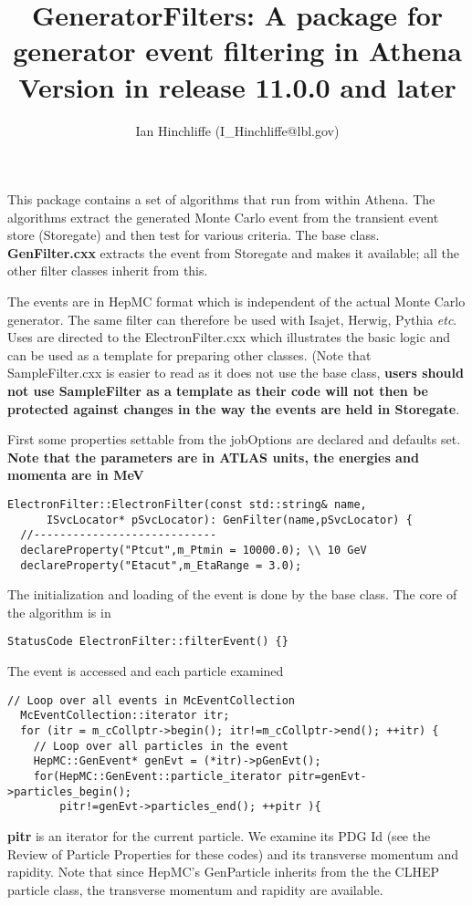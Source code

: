 \documentclass[11pt]{article}
\begin{document}
\title{GeneratorFilters: A package for generator event filtering in  Athena\\
Version in release 11.0.0 and later}
\author{ Ian Hinchliffe (I\_Hinchliffe@lbl.gov)}
\maketitle       
 
This package contains a set of algorithms that run from within Athena.
The algorithms extract the generated Monte Carlo event from the
transient event store (Storegate) and then test for various criteria.
The base class. { \bf GenFilter.cxx} extracts the event from Storegate
and makes it available; all the other filter classes inherit from this.


The events are in HepMC format which is independent of the actual
Monte Carlo generator. The same filter can therefore be used with
Isajet, Herwig, Pythia {\it etc}. Uses are directed to the 
ElectronFilter.cxx which illustrates the basic logic and can be used
as a template for preparing other classes. (Note that SampleFilter.cxx
is easier to read as it does not use the base class, {\bf  users
should not use SampleFilter as a template as their code will not then
be protected against changes in the way the events are held in
Storegate}.

First some properties settable from the jobOptions are declared and
defaults set. {\bf Note that the parameters are in ATLAS units, the
  energies and momenta are in MeV}

\begin{verbatim}
ElectronFilter::ElectronFilter(const std::string& name, 
      ISvcLocator* pSvcLocator): GenFilter(name,pSvcLocator) {
  //----------------------------    
  declareProperty("Ptcut",m_Ptmin = 10000.0); \\ 10 GeV 
  declareProperty("Etacut",m_EtaRange = 3.0); 
\end{verbatim}

The initialization and loading of the event is done by the base
class. The core of the algorithm is in 

\begin{verbatim}
StatusCode ElectronFilter::filterEvent() {}
\end{verbatim}

The event is accessed and each particle examined

\begin{verbatim}
// Loop over all events in McEventCollection
  McEventCollection::iterator itr;
  for (itr = m_cCollptr->begin(); itr!=m_cCollptr->end(); ++itr) {
    // Loop over all particles in the event
    HepMC::GenEvent* genEvt = (*itr)->pGenEvt();
    for(HepMC::GenEvent::particle_iterator pitr=genEvt->particles_begin();
        pitr!=genEvt->particles_end(); ++pitr ){
\end{verbatim}
{\bf pitr} is an iterator for the current particle. We examine its PDG
Id (see the Review of Particle Properties for these codes) and its
transverse momentum and rapidity. Note that since HepMC's GenParticle
inherits from the the CLHEP particle class, the  transverse momentum
and rapidity are available.
\end{document}
